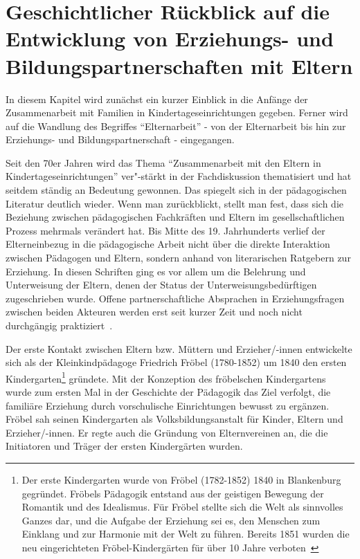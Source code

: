 \documentclass[12pt,a4paper]{article}
\begin{document}
\section{Geschichtlicher Rückblick auf die Entwicklung von Erziehungs- und Bildungspartnerschaften mit Eltern}
In diesem Kapitel wird zunächst ein kurzer Einblick in die Anfänge der Zusammenarbeit mit Familien in Kindertageseinrichtungen gegeben. Ferner wird auf die Wandlung des Begriffes "`Elternarbeit"' -  von der Elternarbeit bis hin zur Erziehungs- und Bildungspartnerschaft - eingegangen.

	 Seit den 70er Jahren wird das Thema "`Zusammenarbeit mit den Eltern in  Kindertageseinrichtungen"' ver"-stärkt in der Fachdiskussion thematisiert und hat seitdem ständig an Bedeutung gewonnen. Das spiegelt sich in der pädagogischen Literatur deutlich wieder. Wenn man zurückblickt, stellt man fest, dass sich die Beziehung zwischen pädagogischen Fachkräften und Eltern im gesellschaftlichen Prozess mehrmals verändert hat. Bis Mitte des 19. Jahrhunderts verlief der Elterneinbezug in die pädagogische Arbeit nicht über die direkte Interaktion zwischen Pädagogen und Eltern, sondern anhand von literarischen Ratgebern zur Erziehung. In diesen Schriften ging es vor allem um die Belehrung und Unterweisung der Eltern, denen der Status der Unterweisungsbedürftigen zugeschrieben wurde. Offene partnerschaftliche Absprachen in Erziehungsfragen zwischen beiden Akteuren werden erst seit kurzer Zeit und noch nicht durchgängig praktiziert~\parencite[S.~43]{Wiezorek}.
	 
	Der erste Kontakt zwischen Eltern bzw. Müttern und Erzieher/-innen entwickelte sich als der Kleinkindpädagoge Friedrich Fröbel (1780-1852) um 1840 den ersten Kindergarten\footnote{Der erste Kindergarten wurde von Fröbel (1782-1852) 1840 in Blankenburg gegründet. Fröbels Pädagogik entstand aus der geistigen Bewegung der Romantik und des Idealismus. Für Fröbel stellte sich die Welt als sinnvolles Ganzes dar, und die Aufgabe der Erziehung sei es, den Menschen zum Einklang und zur Harmonie mit der Welt zu führen. Bereits 1851 wurden die neu eingerichteten Fröbel-Kindergärten für über 10 Jahre verboten~\parencite[S.~10-22]{Berger}} gründete. Mit der Konzeption des fröbelschen Kindergartens wurde zum ersten Mal in der Geschichte der Pädagogik das Ziel verfolgt, die familiäre Erziehung durch vorschulische Einrichtungen bewusst zu ergänzen. Fröbel sah seinen Kindergarten als Volksbildungsanstalt für Kinder, Eltern und Erzieher/-innen. Er regte auch die Gründung von Elternvereinen an, die die Initiatoren und Träger der ersten Kindergärten wurden.
	
\end{document}
